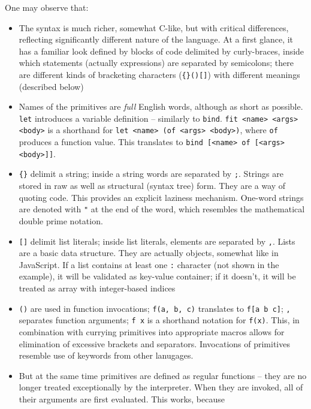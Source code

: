 One may observe that:
\begin{itemize}
    \item The syntax is much richer, somewhat C-like, but with critical
    differences, reflecting significantly different nature of the language. At
    a first glance, it has a familiar look defined by blocks of code delimited
    by curly-braces, inside which statements (actually expressions) are
    separated by semicolons; there are different kinds of bracketing
    characters (\texttt{\{\}()[]}) with different meanings (described below)
    \item Names of the primitives are \textit{full} English words, although as
    short as possible. \texttt{let} introduces a variable definition --
    similarly to \texttt{bind}. \texttt{fit <name> <args> <body>} is a
    shorthand for \texttt{let <name> (of <args> <body>)}, where \texttt{of}
    produces a function value. This translates to \texttt{bind [<name> of
        [<args> <body>]]}.
    \item \texttt{\{\}} delimit a string; inside a string words are separated by
    \texttt{;}. Strings are stored in raw as well as structural (syntax tree)
    form. They are a way of quoting code. This provides an explicit laziness
    mechanism. One-word strings are denoted with \texttt{"} at the end of the
    word, which resembles the mathematical double prime notation.
    \item \texttt{[]} delimit list literals; inside list literals, elements are
    separated by \texttt{,}. Lists are a basic data structure. They are
    actually objects, somewhat like in JavaScript. If a list contains at least
    one \texttt{:} character (not shown in the example), it will be validated
    as key-value container; if it doesn't, it will be treated as array with
    integer-based indices
    \item \texttt{()} are used in function invocations; \texttt{f(a, b, c)}
    translates to \texttt{f[a b c]}; \texttt{,} separates function arguments;
    \texttt{f x} is a shorthand notation for \texttt{f(x)}. This, in
    combination with currying primitives into appropriate macros allows for
    elimination of excessive brackets and separators. Invocations of
    primitives resemble use of keywords from other lanugages.
    \item But at the same time primitives are defined as regular functions --
    they are no longer treated exceptionally by the interpreter. When they are
    invoked, all of their arguments are first evaluated. This works, because

\end{itemize}
